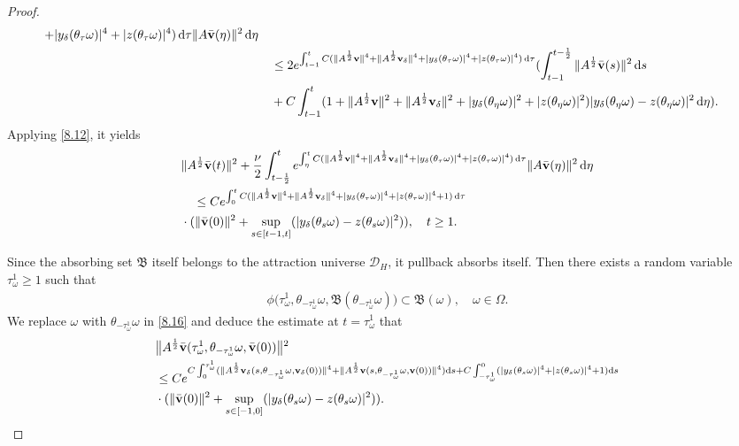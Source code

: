 \documentclass{elsarticle}
\theoremstyle{definition}
\numberwithin{equation}{section}
\newcommand{\D}{\mathcal{D}}
\newcommand{\B}{\mathfrak{B}}
\renewcommand{\d}{{\rm{d}}}
\begin{document}
\begin{proof}
\begin{align*}
{ +|y_\delta(\theta_\tau\omega)|^4+|z(\theta_\tau\omega)|^4)\, \d \tau}\|A\bar{\textbf{v}}(\eta) \|^2 \, \d \eta
\nonumber\\
&\quad \leq  2  e^{ \int_{t-1}^tC(\|A^\frac12\textbf{v}\|^4+\|A^\frac12\textbf{v}_\delta\|^4+|y_\delta(\theta_\tau\omega)|^4+|z(\theta_\tau\omega)|^4)\, \d \tau}( \int_{t-1} ^{t-\frac 12}\|A^\frac12\bar{\textbf{v}}(s)\|^2\, \d s \nonumber\\
&\quad +C\int_{t-1}^t(1+\|A^\frac12\textbf{v}\|^2+\|A^\frac12\textbf{v}_\delta\|^2 +|y_\delta(\theta_\eta\omega)|^2+|z(\theta_\eta\omega)|^2)
|y_\delta(\theta_\eta\omega)-z(\theta_\eta\omega)|^2 \, \d \eta) .
\end{align*}
Applying \eqref{8.12},  it yields
\begin{align}\label{8.16}
 & \|A^\frac12\bar{\textbf{v}}(t)\|^2
 + \frac{\nu}{2}\int_{t-\frac 12} ^te^{\int_\eta^tC(\|A^\frac12\textbf{v}\|^4+\|A^\frac12\textbf{v}_\delta\|^4
 +|y_\delta(\theta_\tau\omega)|^4+|z(\theta_\tau\omega)|^4)\, \d \tau}\|A\bar{\textbf{v}}(\eta) \|^2 \, \d \eta \nonumber  \\
  &\quad  \leq  Ce^{ \int_{0}^tC(\|A^\frac12\textbf{v}\|^4+\|A^\frac12\textbf{v}_\delta\|^4
 +|y_\delta(\theta_\tau\omega)|^4+|z(\theta_\tau\omega)|^4+1)\, \d \tau}\nonumber  \\
   &\cdot(\|\bar{\textbf{v}}(0)\|^2+\sup\limits_{s\in[t-1,t]}(|y_\delta(\theta_s\omega)-z(\theta_s\omega)|^2 ))
,\quad t\geq 1.
\end{align}

Since the absorbing set $\mathfrak B$ itself belongs to the attraction universe $\D_H$,  it pullback absorbs itself. Then  there exists a random variable $\tau_\omega^1 \geq 1$ such that
\begin{align}
 \phi \big(\tau_\omega^1,\theta_{-\tau_\omega^1}\omega, \B(\theta_{-\tau_\omega^1}\omega)\big)
 \subset \B(\omega), \quad \omega\in \Omega.
\end{align}
We replace $\omega$ with $\theta_{-\tau_\omega^1} \omega$ in \eqref{8.16}  and deduce  the estimate at $t=\tau_\omega^1$ that
\begin{align}\label{8.17}
  &\big \|
 A^{\frac 12}  \bar {\textbf{v}}(\tau_\omega^1,\theta_{-\tau_\omega^1}\omega,  \bar{\textbf{v}}(0))  \big \| {^2}\nonumber\\
 &\leq  Ce^{ C\int_{0}^{\tau_\omega^1} (\|A^\frac12\textbf{v}_\delta(s, \theta_{-\tau_\omega^1}\omega, \textbf{v}_\delta(0)) \|^4 +\|A^\frac12\textbf{v}(s, \theta_{-\tau_\omega^1}\omega, \textbf{v}(0)) \|^4)\d s+ C\int^0_{-\tau_\omega^1} (|y_\delta(\theta_s\omega)|^4+|z(\theta_s\omega)|^4+1) \d s}\nonumber\\
 &  \cdot(\|\bar{\textbf{v}}(0)\|^2+\sup\limits_{s\in[-1,0]}(|y_\delta(\theta_s\omega)-z(\theta_s\omega)|^2 )).
\end{align}


\end{proof}
\end{document}
